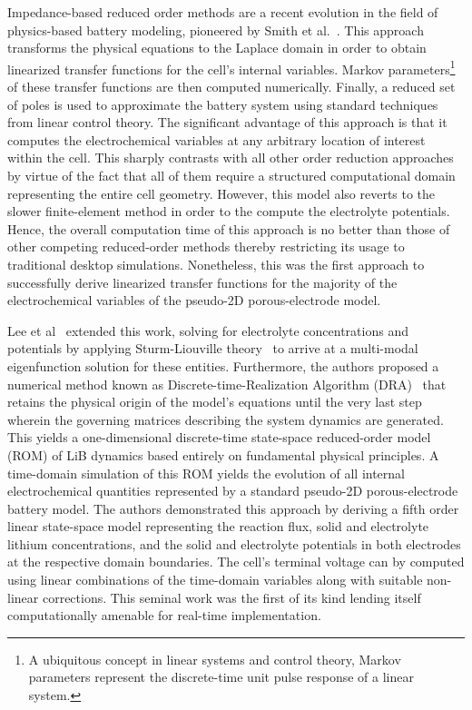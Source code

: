 Impedance-based reduced order methods are a recent evolution in the
field of physics-based battery modeling, pioneered by Smith et al.~\citep{SmithRahnWang2007}.
This approach transforms the physical equations to the Laplace domain
in order to obtain linearized transfer functions for the cell\textquoteright s
internal variables. Markov parameters\footnote{A ubiquitous concept in linear systems and control theory, Markov parameters represent
	the discrete-time unit pulse response of a linear system.} of these transfer functions are then computed numerically. Finally,
a reduced set of poles is used to approximate the battery system using
standard techniques from linear control theory. The significant advantage
of this approach is that it computes the electrochemical variables
at any arbitrary location of interest within the cell. This sharply
contrasts with all other order reduction approaches by virtue of the
fact that all of them require a structured computational domain representing
the entire cell geometry. However, this model also reverts to the
slower finite-element method in order to the compute the electrolyte
potentials. Hence, the overall computation time of this approach is
no better than those of other competing reduced-order methods thereby
restricting its usage to traditional desktop simulations. Nonetheless,
this was the first approach to successfully derive linearized transfer
functions for the majority of the electrochemical variables of the
pseudo-2D porous-electrode model.

Lee et al~\citep{LeeChemistruckPlett2012} extended this work, solving
for electrolyte concentrations and potentials by applying Sturm-Liouville
theory~\citep{PryceAndrew1995} to arrive at a multi-modal eigenfunction
solution for these entities. Furthermore, the authors proposed a numerical
method known as Discrete-time-Realization Algorithm (DRA)~\citep{LeeChemistruckPlett2012a}
that retains the physical origin of the model's equations until the
very last step wherein the governing matrices describing the system
dynamics are generated. This yields a one-dimensional discrete-time
state-space reduced-order model (ROM) of LiB dynamics based entirely
on fundamental physical principles. A time-domain simulation of this
ROM yields the evolution of all internal electrochemical quantities
represented by a standard pseudo-2D porous-electrode battery model.
The authors demonstrated this approach by deriving a fifth order linear
state-space model representing the reaction flux, solid and electrolyte
lithium concentrations, and the solid and electrolyte potentials in
both electrodes at the respective domain boundaries. The cell's terminal
voltage can by computed using linear combinations of the time-domain
variables along with suitable non-linear corrections. This seminal
work was the first of its kind lending itself computationally amenable
for real-time implementation.

